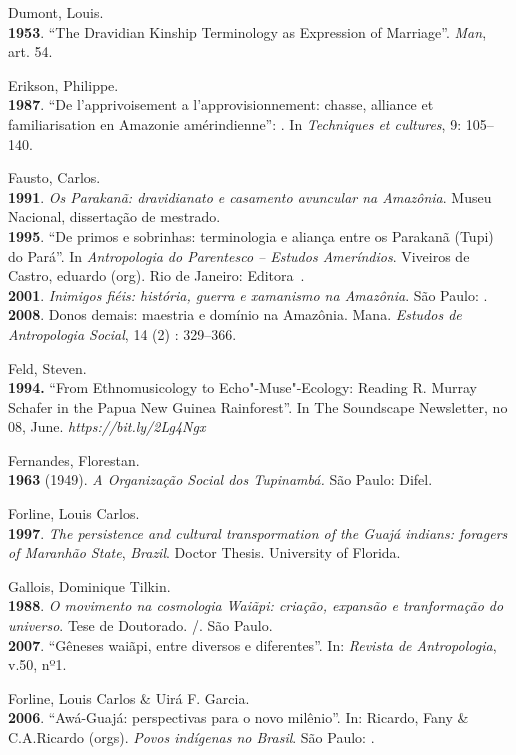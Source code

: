 \begin{Parskip}
Dumont, Louis.\\
\textbf{1953}. ``The Dravidian Kinship Terminology as Expression of
Marriage''. \emph{Man}, art. 54.

Erikson, Philippe.\\
\textbf{1987}. ``De l'apprivoisement a l'approvisionnement: chasse,
alliance et familiarisation en Amazonie amérindienne'': . In
\emph{Techniques et cultures}, 9: 105--140.

Fausto, Carlos.\\
\textbf{1991}. \emph{Os Parakanã: dravidianato e casamento avuncular na
Amazônia}. Museu Nacional, dissertação de mestrado.\\
\textbf{1995}. ``De primos e sobrinhas: terminologia e aliança entre os
Parakanã (Tupi) do Pará''. In \emph{Antropologia do Parentesco -- Estudos
Ameríndios}. Viveiros de Castro, eduardo (org). Rio de Janeiro: Editora~.\\
\textbf{2001}. \emph{Inimigos fiéis: história, guerra e xamanismo na
Amazônia}. São Paulo: .\\
\textbf{2008}. Donos demais: maestria e domínio na Amazônia. Mana.
\emph{Estudos de Antropologia Social}, 14 (2) : 329--366.

Feld, Steven.\\
\textbf{1994.} ``From Ethnomusicology to Echo"-Muse"-Ecology: Reading R.
Murray Schafer in the Papua New Guinea Rainforest''. In The Soundscape
Newsletter, no 08, June.
\emph{https://bit.ly/2Lg4Ngx}

Fernandes, Florestan.\\
\textbf{1963} (1949). \emph{A Organização Social dos Tupinambá.} São
Paulo: Difel.

Forline, Louis Carlos.\\
\textbf{1997}. \emph{The persistence and cultural transpormation of the
Guajá indians: foragers of Maranhão State}, \emph{Brazil}. Doctor
Thesis. University of Florida.

Gallois, Dominique Tilkin.\\
\textbf{1988}. \emph{O movimento na cosmologia Waiãpi: criação, expansão
e tranformação do universo}. Tese de Doutorado. /. São Paulo.\\
\textbf{2007}. ``Gêneses waiãpi, entre diversos e diferentes''. In:
\emph{Revista de Antropologia}, v.50, nº1.

Forline, Louis Carlos \& Uirá F. Garcia.\\
\textbf{2006}. ``Awá-Guajá: perspectivas para o novo milênio''. In:
Ricardo, Fany \& C.A.Ricardo (orgs). \emph{Povos indígenas no Brasil}.
São Paulo: .


\end{Parskip}
